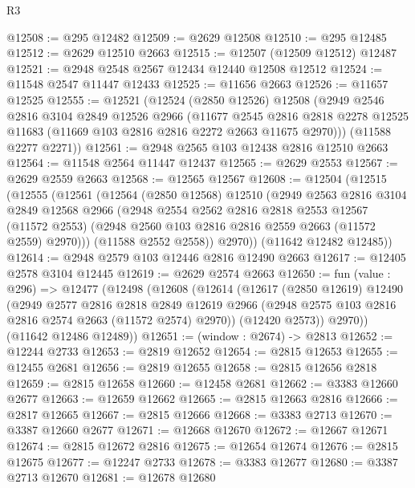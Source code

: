 \begin{lexlean}{R3}
\begin{coremodule}
@12508 := @295 @12482
@12509 := @2629 @12508
@12510 := @295 @12485
@12512 := @2629 @12510 @2663
@12515 := @12507 (@12509 @12512) @12487
@12521 := @2948 @2548 @2567 @12434 @12440 @12508 @12512
@12524 := @11548 @2547 @11447 @12433
@12525 := @11656 @2663
@12526 := @11657 @12525
@12555 := @12521
    (@12524
      (@2850 @12526)
      @12508
      (@2949
        @2546
        @2816
        @3104
        @2849
        @12526
        @2966
        (@11677
          @2545
          @2816
          @2818
          @2278
          @12525
          @11683
          (@11669 @103 @2816 @2816 @2272 @2663 @11675 @2970)))
      (@11588 @2277 @2271))
@12561 := @2948 @2565 @103 @12438 @2816 @12510 @2663
@12564 := @11548 @2564 @11447 @12437
@12565 := @2629 @2553
@12567 := @2629 @2559 @2663
@12568 := @12565 @12567
@12608 := @12504
    (@12515
      (@12555
        (@12561
          (@12564
            (@2850 @12568)
            @12510
            (@2949
              @2563
              @2816
              @3104
              @2849
              @12568
              @2966
              (@2948
                @2554
                @2562
                @2816
                @2818
                @2553
                @12567
                (@11572 @2553)
                (@2948 @2560 @103 @2816 @2816 @2559 @2663 (@11572 @2559) @2970)))
            (@11588 @2552 @2558))
          @2970))
      (@11642 @12482 @12485))
@12614 := @2948 @2579 @103 @12446 @2816 @12490 @2663
@12617 := @12405 @2578 @3104 @12445
@12619 := @2629 @2574 @2663
@12650 := fun (value : @296) =>
  @12477
    (@12498
      (@12608
        (@12614
          (@12617
            (@2850 @12619)
            @12490
            (@2949
              @2577
              @2816
              @2818
              @2849
              @12619
              @2966
              (@2948 @2575 @103 @2816 @2816 @2574 @2663 (@11572 @2574) @2970))
            (@12420 @2573))
          @2970))
      (@11642 @12486 @12489))
@12651 := (window : @2674) -> @2813
@12652 := @12244 @2733
@12653 := @2819 @12652
@12654 := @2815 @12653
@12655 := @12455 @2681
@12656 := @2819 @12655
@12658 := @2815 @12656 @2818
@12659 := @2815 @12658
@12660 := @12458 @2681
@12662 := @3383 @12660 @2677
@12663 := @12659 @12662
@12665 := @2815 @12663 @2816
@12666 := @2817 @12665
@12667 := @2815 @12666
@12668 := @3383 @2713
@12670 := @3387 @12660 @2677
@12671 := @12668 @12670
@12672 := @12667 @12671
@12674 := @2815 @12672 @2816
@12675 := @12654 @12674
@12676 := @2815 @12675
@12677 := @12247 @2733
@12678 := @3383 @12677
@12680 := @3387 @2713 @12670
@12681 := @12678 @12680

\end{coremodule}
\end{lexlean}
